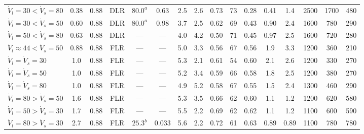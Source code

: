 \documentclass[14pt,letterpaper,fleqn]{extarticle}
\renewcommand{\textbf}[1]{#1}
\begin{document}
\begin{landscape}
\begin{table}[p]
\begin{adjustbox}{
    max totalsize={0.97\linewidth}{0.90\textheight},
    center
}
\begin{tabular}{
@{}
>{\raggedright\arraybackslash}p{3.50cm}
ccccccccc
ccc
ccc
@{}
}
\midrule
\multicolumn{16}{c}{
$\boldsymbol{w_{\mathrm{NaCl},s}=3.5\%
\approx 35~\mathrm{g_s\,L_{mix}^{-1}}}$}
\\
\midrule

$\dot{V}_{l}=30<\dot{V}_{s}=80$
& 0.38 & 0.88 & DLR & $80.0^{a}$ & 0.63 & 2.5 & 2.6 & 0.73 & 73
& 0.28 & 0.41 & 1.4 & 2500 & 1700 & 480
\\

$\dot{V}_{l}=30<\dot{V}_{s}=50$
& 0.60 & 0.88 & DLR & $80.0^{a}$ & 0.98 & 3.7 & 2.5 & 0.62 & 69
& 0.43 & 0.90 & 2.4 & 1600 & 780 & 290
\\

$\dot{V}_{l}=50<\dot{V}_{s}=80$
& 0.63 & 0.88 & DLR & --- & --- & 4.0 & 4.2 & 0.50 & 71
& 0.45 & 0.97 & 2.5 & 1600 & 720 & 280
\\

\textbf{$\dot{V}_{l}\approx44<\dot{V}_{s}=50$}
& \textbf{0.88} & \textbf{0.88} & \textbf{FLR}
& \textbf{---} & \textbf{---} & \textbf{5.0} & \textbf{3.3}
& \textbf{0.56} & \textbf{67}
& \textbf{0.56} & \textbf{1.9} & \textbf{3.3}
& \textbf{1200} & \textbf{360} & \textbf{210}
\\

$\dot{V}_{l}=\dot{V}_{s}=30$
& 1.0 & 0.88 & FLR & --- & --- & 5.3 & 2.1 & 0.61 & 54
& 0.60 & 2.1 & 2.6 & 1200 & 330 & 270
\\

\textbf{$\dot{V}_{l}=\dot{V}_{s}=50$}
& \textbf{1.0} & \textbf{0.88} & \textbf{FLR}
& \textbf{---} & \textbf{---} & \textbf{5.2} & \textbf{3.4}
& \textbf{0.59} & \textbf{66}
& \textbf{0.58} & \textbf{1.8} & \textbf{2.5}
& \textbf{1200} & \textbf{380} & \textbf{270}
\\

$\dot{V}_{l}=\dot{V}_{s}=80$
& 1.0 & 0.88 & FLR & --- & --- & 4.9 & 5.2 & 0.58 & 67
& 0.55 & 1.5 & 2.4 & 1300 & 460 & 290
\\

$\dot{V}_{l}=80>\dot{V}_{s}=50$
& 1.6 & 0.88 & FLR & --- & --- & 5.3 & 3.5 & 0.66 & 62
& 0.60 & 1.1 & 1.2 & 1200 & 620 & 580
\\

$\dot{V}_{l}=50>\dot{V}_{s}=30$
& 1.7 & 0.88 & FLR & --- & --- & 5.5 & 2.2 & 0.69 & 62
& 0.62 & 1.1 & 1.2 & 1100 & 600 & 590
\\

$\dot{V}_{l}=80>\dot{V}_{s}=30$
& 2.7 & 0.88 & FLR & $25.3^{b}$ & 0.033 & 5.6 & 2.2 & 0.72 & 61
& 0.63 & 0.89 & 0.89 & 1100 & 780 & 780
\\


\end{tabular}
\end{adjustbox}
\end{table}
\end{landscape}
\end{document}
